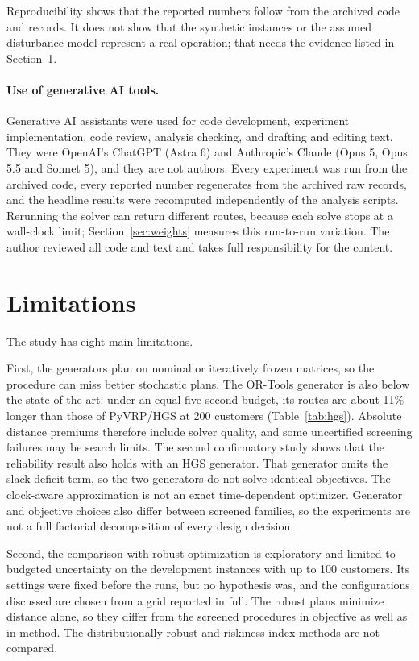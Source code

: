 \documentclass[11pt,a4paper]{article}
\begin{document}
Reproducibility shows that the reported numbers follow from the archived code and
records. It does not show that the synthetic instances or the assumed disturbance
model represent a real operation; that needs the evidence listed in
Section~\ref{sec:limitations}.

\paragraph{Use of generative AI tools.} Generative AI assistants were used for
code development, experiment implementation, code review, analysis checking, and
drafting and editing text. They were OpenAI's ChatGPT (Astra 6) and Anthropic's
Claude (Opus 5, Opus 5.5 and Sonnet 5), and they are not authors. Every experiment
was run from the archived code, every reported number regenerates from the
archived raw records, and the headline results were recomputed independently of
the analysis scripts. Rerunning the solver can return different routes, because
each solve stops at a wall-clock limit; Section~\ref{sec:weights} measures this
run-to-run variation. The author reviewed all code and text and takes full
responsibility for the content.

\section{Limitations}\label{sec:limitations}

The study has eight main limitations.

First, the generators plan on nominal or iteratively frozen matrices, so the
procedure can miss better stochastic plans. The OR-Tools generator is also below
the state of the art: under an equal five-second budget, its routes are about
11\% longer than those of PyVRP/HGS at 200 customers (Table~\ref{tab:hgs}).
Absolute distance premiums therefore include solver quality, and some uncertified
screening failures may be search limits. The second confirmatory study shows that
the reliability result also holds with an HGS generator. That generator omits
the slack-deficit term, so the two generators do not solve identical objectives.
The clock-aware approximation is not an exact time-dependent optimizer. Generator
and objective choices also differ between screened families, so the experiments
are not a full factorial decomposition of every design decision.

Second, the comparison with robust optimization is exploratory and limited to
budgeted uncertainty on the development instances with up to 100 customers. Its
settings were fixed before the runs, but no hypothesis was, and the
configurations discussed are chosen from a grid reported in full. The robust
plans minimize distance alone, so they differ from the screened procedures in
objective as well as in method. The distributionally robust and riskiness-index
methods \cite{jaillet2016,zhang2019} are not compared.
\end{document}
